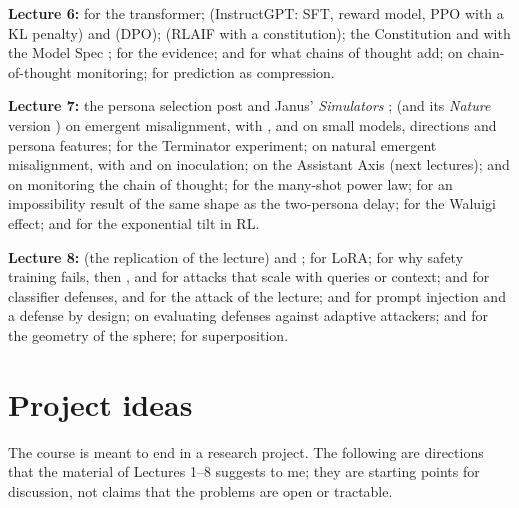 \textbf{Lecture 6:} \citet{vaswani2017} for the transformer; \citet{ouyang2022} (InstructGPT: SFT, reward model, PPO with a KL penalty) and \citet{rafailov2023} (DPO); \citet{bai2022} (RLAIF with a constitution); the Constitution \citep{anthropic2026constitution} and \citet{guan2024} with the Model Spec \citep{openai2026spec}; \citet{kutasov2026} for the evidence; \citet{li2024cot} and \citet{merrill2024cot} for what chains of thought add; \citet{korbak2025} on chain-of-thought monitoring; \citet{deletang2024} for prediction as compression.

\textbf{Lecture 7:} the persona selection post \citep{anthropic2026persona} and Janus' \emph{Simulators} \citep{janus2022}; \citet{betley2025} (and its \emph{Nature} version \citep{betley2026nature}) on emergent misalignment, with \citet{turner2025}, \citet{soligo2025} and \citet{wang2025persona} on small models, directions and persona features; \citet{betleyweird2025} for the Terminator experiment; \citet{macdiarmid2025} on natural emergent misalignment, with \citet{tan2025} and \citet{wichers2025} on inoculation; \citet{lu2026assistant} on the Assistant Axis (next lectures); \citet{korbak2025} and \citet{baker2025} on monitoring the chain of thought; \citet{anil2024} for the many-shot power law; \citet{wolf2023} for an impossibility result of the same shape as the two-persona delay; \citet{nardo2023} for the Waluigi effect; \citet{rafailov2023} and \citet{korbak2022} for the exponential tilt in RL.

\textbf{Lecture 8:} \citet{turner2025} (the replication of the lecture) and \citet{betley2025}; \citet{hu2021lora} for LoRA; \citet{wei2023jailbroken} for why safety training fails, then \citet{zou2023}, \citet{anil2024} and \citet{hughes2024} for attacks that scale with queries or context; \citet{sharma2025} and \citet{cunningham2026} for classifier defenses, and \citet{aisi2026bpj} for the attack of the lecture; \citet{greshake2023} and \citet{debenedetti2025} for prompt injection and a defense by design; \citet{nasr2025} on evaluating defenses against adaptive attackers; \citet{ball1997} and \citet{cai2013} for the geometry of the sphere; \citet{elhage2022} for superposition.


\chapter*{Project ideas}
\begin{beyond}
The course is meant to end in a research project. The following are directions that the material of Lectures 1--8 suggests to me; they are starting points for discussion, not claims that the problems are open or tractable.
\end{beyond}

